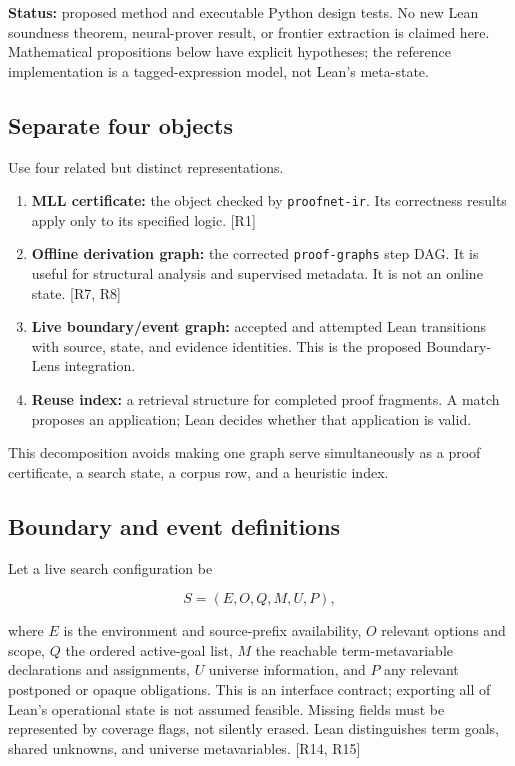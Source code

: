 \documentclass[
  10pt,
]{article}
\providecommand{\tightlist}{%
  \setlength{\itemsep}{0pt}\setlength{\parskip}{0pt}}
\begin{document}
\textbf{Status:} proposed method and executable Python design tests. No
new Lean soundness theorem, neural-prover result, or frontier extraction
is claimed here. Mathematical propositions below have explicit
hypotheses; the reference implementation is a tagged-expression model,
not Lean's meta-state.

\subsection{Separate four objects}\label{separate-four-objects}

Use four related but distinct representations.

\begin{enumerate}
\def\labelenumi{\arabic{enumi}.}
\tightlist
\item
  \textbf{MLL certificate:} the object checked by \texttt{proofnet-ir}.
  Its correctness results apply only to its specified logic. {[}R1{]}
\item
  \textbf{Offline derivation graph:} the corrected \texttt{proof-graphs}
  step DAG. It is useful for structural analysis and supervised
  metadata. It is not an online state. {[}R7, R8{]}
\item
  \textbf{Live boundary/event graph:} accepted and attempted Lean
  transitions with source, state, and evidence identities. This is the
  proposed Boundary-Lens integration.
\item
  \textbf{Reuse index:} a retrieval structure for completed proof
  fragments. A match proposes an application; Lean decides whether that
  application is valid.
\end{enumerate}

This decomposition avoids making one graph serve simultaneously as a
proof certificate, a search state, a corpus row, and a heuristic index.

\subsection{Boundary and event
definitions}\label{boundary-and-event-definitions}

Let a live search configuration be

\[S=(E,O,Q,M,U,P),\]

where \(E\) is the environment and source-prefix availability, \(O\)
relevant options and scope, \(Q\) the ordered active-goal list, \(M\)
the reachable term-metavariable declarations and assignments, \(U\)
universe information, and \(P\) any relevant postponed or opaque
obligations. This is an interface contract; exporting all of Lean's
operational state is not assumed feasible. Missing fields must be
represented by coverage flags, not silently erased. Lean distinguishes
term goals, shared unknowns, and universe metavariables. {[}R14, R15{]}
\end{document}
